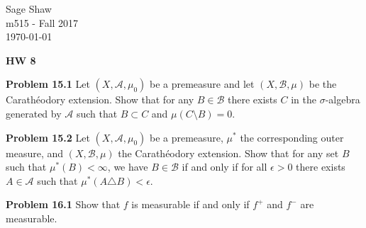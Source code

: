 \documentclass[12pt]{article}
\newcommand{\problem}[1]{\hspace{-4 ex} \large \textbf{Problem #1} }
\begin{document}
	\thispagestyle{empty}
	
	\begin{flushright}
		Sage Shaw \\
		m515 - Fall 2017 \\
		\today
	\end{flushright}
	
{\large \textbf{HW 8}}\bigbreak

\problem{15.1} 
Let $(X,\mathcal A,\mu_0)$ be a premeasure and let $(X,\mathcal B,\mu)$ be the Carath\'eodory extension. Show that for any $B\in\mathcal B$ there exists $C$ in the $\sigma$-algebra generated by $\mathcal A$ such that $B\subset C$ and $\mu(C\setminus B)=0$.
\bigbreak



\bigbreak
\problem{15.2} Let $(X,\mathcal A,\mu_0)$ be a premeasure, $\mu^*$ the corresponding outer measure, and $(X,\mathcal B,\mu)$ the Carath\'eodory extension. Show that for any set $B$ such that $\mu^*(B)<\infty$, we have $B\in\mathcal B$ if and only if for all $\epsilon>0$ there exists $A\in\mathcal A$ such that $\mu^*(A\triangle B)<\epsilon$.
\bigbreak



\bigbreak
\problem{16.1} Show that $f$ is measurable if and only if $f^+$ and $f^-$ are measurable.
\bigbreak
\end{document}

